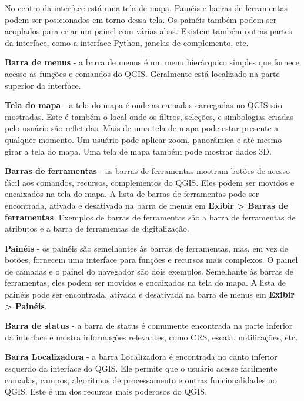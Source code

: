 \documentclass[
]{krantz}
\begin{document}
No centro da interface está uma tela de mapa. Painéis e barras de ferramentas podem ser posicionados em torno dessa tela. Os painéis também podem ser acoplados para criar um painel com várias abas. Existem também outras partes da interface, como a interface Python, janelas de complemento, etc.

\textbf{Barra de menus} - a barra de menus é um menu hierárquico simples que fornece acesso às funções e comandos do QGIS. Geralmente está localizado na parte superior da interface.

\textbf{Tela do mapa} - a tela do mapa é onde as camadas carregadas no QGIS são mostradas. Este é também o local onde os filtros, seleções, e simbologias criadas pelo usuário são refletidas. Mais de uma tela de mapa pode estar presente a qualquer momento. Um usuário pode aplicar zoom, panorâmica e até mesmo girar a tela do mapa. Uma tela de mapa também pode mostrar dados 3D.

\textbf{Barras de ferramentas} - as barras de ferramentas mostram botões de acesso fácil aos comandos, recursos, complementos do QGIS. Eles podem ser movidos e encaixados na tela do mapa. A lista de barras de ferramentas pode ser encontrada, ativada e desativada na barra de menus em \textbf{Exibir \textgreater{} Barras de ferramentas}. Exemplos de barras de ferramentas são a barra de ferramentas de atributos e a barra de ferramentas de digitalização.

\textbf{Painéis} - os painéis são semelhantes às barras de ferramentas, mas, em vez de botões, fornecem uma interface para funções e recursos mais complexos. O painel de camadas e o painel do navegador são dois exemplos. Semelhante às barras de ferramentas, eles podem ser movidos e encaixados na tela do mapa. A lista de painéis pode ser encontrada, ativada e desativada na barra de menus em \textbf{Exibir \textgreater{} Painéis}.

\textbf{Barra de status} - a barra de status é comumente encontrada na parte inferior da interface e mostra informações relevantes, como CRS, escala, notificações, etc.

\textbf{Barra Localizadora} - a barra Localizadora é encontrada no canto inferior esquerdo da interface do QGIS. Ele permite que o usuário acesse facilmente camadas, campos, algoritmos de processamento e outras funcionalidades no QGIS. Este é um dos recursos mais poderosos do QGIS.
\end{document}
